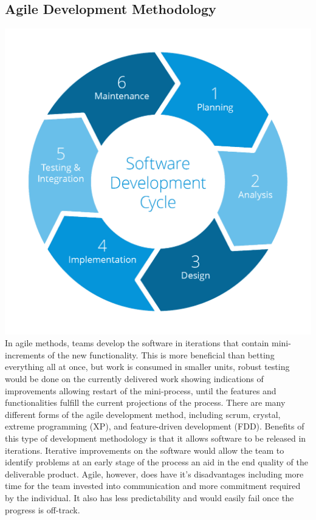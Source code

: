 \documentclass[a4paper]{article}
\begin{document}
{\subsection{Agile Development Methodology}
\includegraphics[scale = 0.2]{agile.png}
\autocite{D01}
\bigbreak
In agile methods, teams develop the software in iterations that contain mini-increments of the new functionality. This is more beneficial than betting everything all at once, but work is consumed in smaller units, robust testing would be done on the currently delivered work showing indications of improvements allowing restart of the mini-process, until the features and functionalities fulfill the current projections of the process. There are many different forms of the agile development method, including scrum, crystal, extreme programming (XP), and feature-driven development (FDD).
\bigbreak
Benefits of this type of development methodology is that it allows software to be released in iterations. Iterative improvements on the software would allow the team to identify problems at an early stage of the process an aid in the end quality of the deliverable product.
\bigbreak 
Agile, however, does have it's disadvantages including more time for the team invested into communication and more commitment required by the individual. It also has less predictability and would easily fail once the progress is off-track.

}
\end{document}
